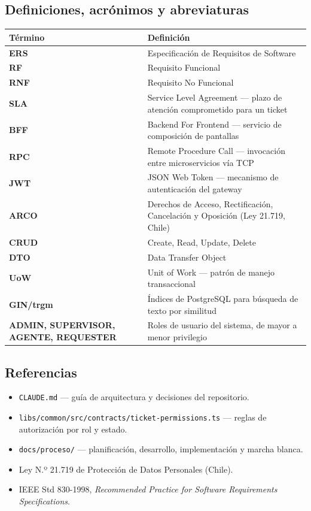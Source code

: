 \documentclass[11pt,a4paper]{article}
\begin{document}
\subsection{Definiciones, acrónimos y abreviaturas}

\begin{longtable}{@{}>{\bfseries}p{3.2cm} L{11cm}@{}}
\toprule
\textbf{Término} & \textbf{Definición} \\
\midrule
\endhead
ERS & Especificación de Requisitos de Software \\
RF & Requisito Funcional \\
RNF & Requisito No Funcional \\
SLA & Service Level Agreement — plazo de atención comprometido para un ticket \\
BFF & Backend For Frontend — servicio de composición de pantallas \\
RPC & Remote Procedure Call — invocación entre microservicios vía TCP \\
JWT & JSON Web Token — mecanismo de autenticación del gateway \\
ARCO & Derechos de Acceso, Rectificación, Cancelación y Oposición (Ley 21.719, Chile) \\
CRUD & Create, Read, Update, Delete \\
DTO & Data Transfer Object \\
UoW & Unit of Work — patrón de manejo transaccional \\
GIN/trgm & Índices de PostgreSQL para búsqueda de texto por similitud \\
ADMIN, SUPERVISOR, AGENTE, REQUESTER & Roles de usuario del sistema, de mayor a menor privilegio \\
\bottomrule
\end{longtable}

\subsection{Referencias}
\begin{itemize}[leftmargin=1.2cm]
  \item \texttt{CLAUDE.md} — guía de arquitectura y decisiones del repositorio.
  \item \texttt{libs/common/src/contracts/ticket-permissions.ts} — reglas de autorización por rol y estado.
  \item \texttt{docs/proceso/} — planificación, desarrollo, implementación y marcha blanca.
  \item Ley N.º 21.719 de Protección de Datos Personales (Chile).
  \item IEEE Std 830-1998, \emph{Recommended Practice for Software Requirements Specifications}.
\end{itemize}
\end{document}
